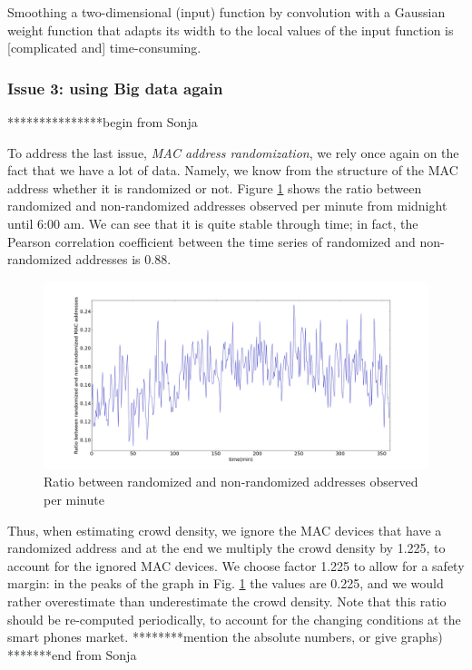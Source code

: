 \documentclass[10pt,a4paper]{article}
\begin{document}
Smoothing a two-dimensional (input) function by convolution with a Gaussian weight function that adapts its width to the local values of the input function is [complicated and] time-consuming.\\


\subsubsection{Issue 3: using Big data again}

***************begin from Sonja

To address the last issue, {\it MAC address randomization}, we rely once again on the fact that we have a lot of data. Namely, we know from the structure of the MAC address whether it is randomized or not. Figure \ref{fig:randomized} shows the ratio between randomized and non-randomized addresses observed per minute from midnight until 6:00 am. We can see that it is quite stable through time; in fact, the Pearson correlation coefficient between the time series of randomized and non-randomized addresses is 0.88. 

\begin{figure}[h!]
	\centering
	\includegraphics[width=130mm]{RatioRandNonrand.jpeg}
	\caption{Ratio between randomized and non-randomized addresses observed per minute}
	\label{fig:randomized}
\end{figure} 

Thus, when estimating crowd density, we ignore the MAC devices that have a randomized address and at the end we multiply the crowd density by 1.225, to account for the ignored MAC devices. We choose factor 1.225 to allow for a safety margin: in the peaks of the graph in Fig. \ref{fig:randomized} the values are 0.225, and we would rather overestimate than underestimate the crowd density. 
Note that this ratio should be re-computed periodically, to account for the changing conditions at the smart phones market. 
********mention the absolute numbers, or give graphs)
*******end from Sonja
\end{document}
